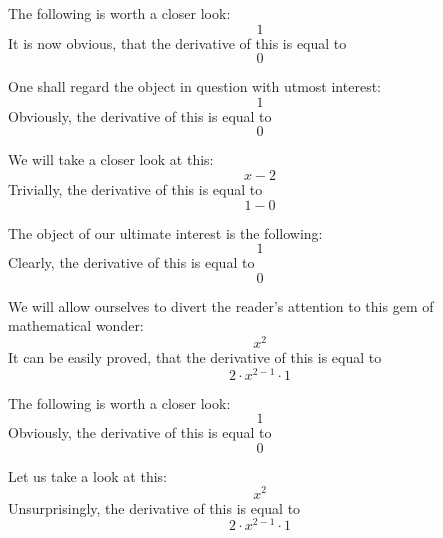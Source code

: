 \documentclass{article}
\begin{document}
The following is worth a closer look:
\begin{equation}
1 
\end{equation}
It is now obvious, that the derivative of this is equal to
\begin{equation}
0 
\end{equation}

One shall regard the object in question with utmost interest:
\begin{equation}
1 
\end{equation}
Obviously, the derivative of this is equal to
\begin{equation}
0 
\end{equation}

We will take a closer look at this:
\begin{equation}
x - 2 
\end{equation}
Trivially, the derivative of this is equal to
\begin{equation}
1 - 0 
\end{equation}

The object of our ultimate interest is the following:
\begin{equation}
1 
\end{equation}
Clearly, the derivative of this is equal to
\begin{equation}
0 
\end{equation}

We will allow ourselves to divert the reader's attention to this gem of mathematical wonder:
\begin{equation}
x ^{2 } 
\end{equation}
It can be easily proved, that the derivative of this is equal to
\begin{equation}
2 \cdot x ^{2 - 1 } \cdot 1 
\end{equation}

The following is worth a closer look:
\begin{equation}
1 
\end{equation}
Obviously, the derivative of this is equal to
\begin{equation}
0 
\end{equation}

Let us take a look at this:
\begin{equation}
x ^{2 } 
\end{equation}
Unsurprisingly, the derivative of this is equal to
\begin{equation}
2 \cdot x ^{2 - 1 } \cdot 1 
\end{equation}
\end{document}
